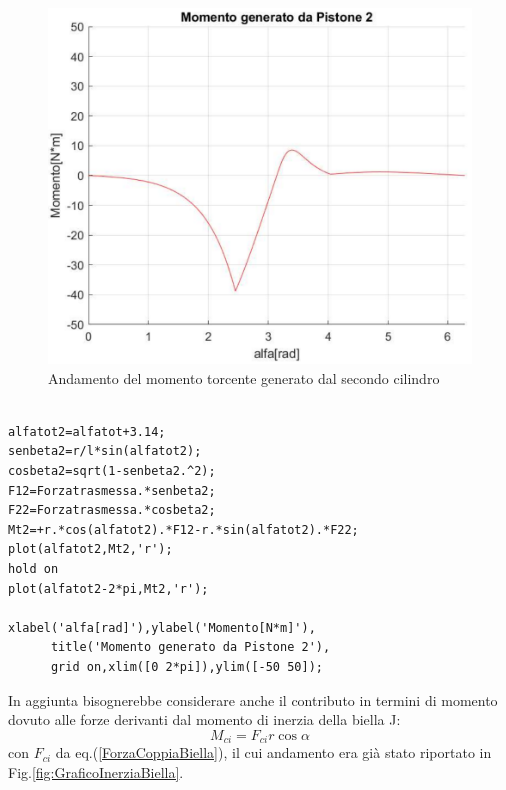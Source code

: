 \begin{figure}[h]
    \centering
    \includegraphics[scale=0.45]{Immagini/GraficoMomento2.png}
    \caption{Andamento del momento torcente generato dal secondo cilindro}
    \label{fig:GraficoMomento2}
\end{figure}
\begin{lstlisting}[frame=trBL]
%Momento torcente pistone 2

alfatot2=alfatot+3.14;
senbeta2=r/l*sin(alfatot2);
cosbeta2=sqrt(1-senbeta2.^2);
F12=Forzatrasmessa.*senbeta2;
F22=Forzatrasmessa.*cosbeta2;
Mt2=+r.*cos(alfatot2).*F12-r.*sin(alfatot2).*F22;
plot(alfatot2,Mt2,'r');
hold on
plot(alfatot2-2*pi,Mt2,'r');

xlabel('alfa[rad]'),ylabel('Momento[N*m]'),
      title('Momento generato da Pistone 2'),
      grid on,xlim([0 2*pi]),ylim([-50 50]);
\end{lstlisting}
In aggiunta bisognerebbe considerare anche il contributo in termini di momento dovuto alle forze derivanti dal momento di inerzia della biella J:
\begin{equation}
    M_{ci}=F_{ci}r\cos\alpha
\end{equation}
con $F_{ci}$ da eq.(\ref{ForzaCoppiaBiella}), il cui andamento era già stato riportato in Fig.\ref{fig:GraficoInerziaBiella}.
